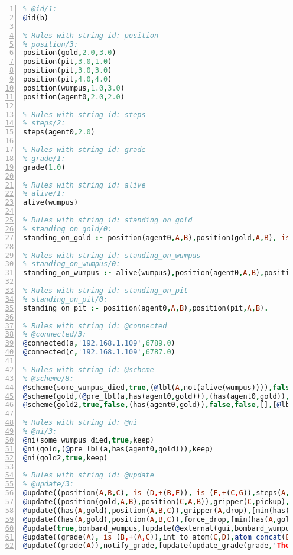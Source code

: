 \documentclass[11pt]{article}\usepackage[utf8]{inputenc}\usepackage{geometry}
\begin{document}
\lstset{breaklines=true}\begin{lstlisting}[language=Prolog, numbers=left]
% Rules with string id: @id
% @id/1:
@id(b)

% Rules with string id: position
% position/3:
position(gold,2.0,3.0)
position(pit,3.0,1.0)
position(pit,3.0,3.0)
position(pit,4.0,4.0)
position(wumpus,1.0,3.0)
position(agent0,2.0,2.0)

% Rules with string id: steps
% steps/2:
steps(agent0,2.0)

% Rules with string id: grade
% grade/1:
grade(1.0)

% Rules with string id: alive
% alive/1:
alive(wumpus)

% Rules with string id: standing_on_gold
% standing_on_gold/0:
standing_on_gold :- position(agent0,A,B),position(gold,A,B), is (C,+(A,B)),>(C,2.0).

% Rules with string id: standing_on_wumpus
% standing_on_wumpus/0:
standing_on_wumpus :- alive(wumpus),position(agent0,A,B),position(wumpus,A,B).

% Rules with string id: standing_on_pit
% standing_on_pit/0:
standing_on_pit :- position(agent0,A,B),position(pit,A,B).

% Rules with string id: @connected
% @connected/3:
@connected(a,'192.168.1.109',6789.0)
@connected(c,'192.168.1.109',6787.0)

% Rules with string id: @scheme
% @scheme/8:
@scheme(some_wumpus_died,true,(@lbl(A,not(alive(wumpus)))),false,false,false,[update(bombard_wumpus)|[]],[])
@scheme(gold,(@pre_lbl(a,has(agent0,gold))),(has(agent0,gold)),false,(@lbl(a,not(has(agent0,gold)))),false,[update(force_drop)|[]],[])
@scheme(gold2,true,false,(has(agent0,gold)),false,false,[],[@lbl(c,update(bombard_wumpus))|[]])

% Rules with string id: @ni
% @ni/3:
@ni(some_wumpus_died,true,keep)
@ni(gold,(@pre_lbl(a,has(agent0,gold))),keep)
@ni(gold2,true,keep)

% Rules with string id: @update
% @update/3:
@update((position(A,B,C), is (D,+(B,E)), is (F,+(C,G)),steps(A,H), is (I,+(H,1.0))),move(A,E,G),[min(position(A,B,C)),plus(position(A,D,F)),min(steps(A,H)),plus(steps(A,I))|[]])
@update((position(gold,A,B),position(C,A,B)),gripper(C,pickup),[plus(has(C,gold)),min(position(gold,A,B))|[]])
@update((has(A,gold),position(A,B,C)),gripper(A,drop),[min(has(A,gold)),plus(position(gold,B,C))|[]])
@update((has(A,gold),position(A,B,C)),force_drop,[min(has(A,gold)),plus(position(gold,B,C)),update(@external(gui,gripper,D))|[]])
@update(true,bombard_wumpus,[update(@external(gui,bombard_wumpus,A)),min(alive(wumpus))|[]])
@update((grade(A), is (B,+(A,C)),int_to_atom(C,D),atom_concat(E,D,F)),update_grade(G,E,C),[min(grade(A)),plus(grade(B)),update(@external(gui,show_notice(G,F),H))|[]])
@update((grade(A)),notify_grade,[update(update_grade(grade,'The end result: ',A))|[]])

\end{lstlisting}
\clearpage 
\end{document}
